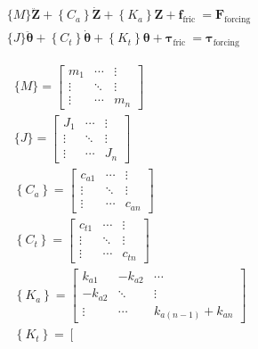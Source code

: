 \begin{equation}\label{Vector_form}
  \begin{aligned}
  & \{M\} \ddot{\boldsymbol{Z}}+\left\{C_a\right\} \dot{\boldsymbol{Z}}+\left\{K_a\right\} \boldsymbol{Z}+\boldsymbol{f}_{\text {fric }}=\boldsymbol{F}_{\text {forcing }} \\
  & \{J\} \ddot{\boldsymbol{\theta}}+\left\{C_t\right\} \dot{\boldsymbol{\theta}}+\left\{K_t\right\} \boldsymbol{\theta}+\boldsymbol{\tau}_{\text {fric }}=\boldsymbol{\tau}_{\text {forcing }}
  \end{aligned}
\end{equation}


\begin{equation}\label{12}
  \begin{aligned}
  & \{M\}=\left[\begin{array}{ccc}
  m_1 & \cdots & \vdots \\
  \vdots & \ddots & \vdots \\
  \vdots & \cdots & m_n
  \end{array}\right] \\
  & \{J\}=\left[\begin{array}{ccc}
  J_1 & \cdots & \vdots \\
  \vdots & \ddots & \vdots \\
  \vdots & \cdots & J_n
  \end{array}\right] \\
  & \left\{C_a\right\}=\left[\begin{array}{ccc}
  c_{a 1} & \cdots & \vdots \\
  \vdots & \ddots & \vdots \\
  \vdots & \cdots & c_{a n}
  \end{array}\right] \\
  & \left\{C_t\right\}=\left[\begin{array}{ccc}
  c_{t 1} & \cdots & \vdots \\
  \vdots & \ddots & \vdots \\
  \vdots & \cdots & c_{t n}
  \end{array}\right] \\
  & \left\{K_a\right\}=\left[\begin{array}{ccc}
  k_{a 1} & -k_{a 2} & \cdots \\
  -k_{a 2} & \ddots & \vdots \\
  \vdots & \cdots & k_{a(n-1)}+k_{a n}
  \end{array}\right] \\
  & \left\{K_t\right\}=\left[\begin{array}{ccc}

\end{array}
\end{aligned}
\end{equation}
